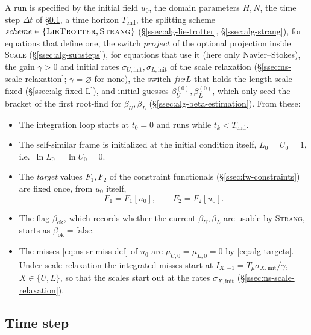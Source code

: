 \documentclass{article}
\begin{document}
A run is specified by the initial field $u_0$, the domain parameters $H, N$,
the time step $\Delta t$ of
\S\ref{ssec:alg-timestep}, a time horizon $T_{\mathrm{end}}$, the
splitting scheme
$\mathit{scheme} \in \{\textsc{LieTrotter}, \textsc{Strang}\}$
(\S\ref{ssec:alg-lie-trotter}, \S\ref{ssec:alg-strang}), for equations that
define one, the switch $\mathit{project}$ of the optional projection inside
\textsc{Scale} (\S\ref{ssec:alg-substeps}), for equations that use it (here
only Navier--Stokes), the gain $\gamma > 0$ and initial rates
$\sigma_{U,\mathrm{init}}, \sigma_{L,\mathrm{init}}$ of the scale relaxation
(\S\ref{ssec:ns-scale-relaxation}; $\gamma = \varnothing$ for none), the
switch $\mathit{fixL}$ that holds the length scale fixed
(\S\ref{ssec:alg-fixed-L}), and initial guesses
$\beta_U^{(0)}, \beta_L^{(0)}$, which only seed the bracket of the first
root-find for $\beta_U, \beta_L$ (\S\ref{ssec:alg-beta-estimation}). From these:
\begin{itemize}
  \item The integration loop starts at $t_0 = 0$ and runs while $t_k < T_{\mathrm{end}}$.
  \item The self-similar frame is initialized at the initial condition itself,
  $L_0 = U_0 = 1$, i.e.\ $\ln L_0 = \ln U_0 = 0$.
  \item The \emph{target} values $F_1, F_2$ of the constraint functionals
  (\S\ref{ssec:fw-constraints}) are fixed once, from $u_0$ itself,
  \begin{equation}\label{eq:alg-targets}
    F_1 = F_1[u_0], \qquad F_2 = F_2[u_0].
  \end{equation}
  \item The flag $\beta_{\mathrm{ok}}$, which records whether the current
  $\beta_U, \beta_L$ are usable by \textsc{Strang}, starts as
  $\beta_{\mathrm{ok}} = \text{false}$.
  \item The misses \eqref{eq:ns-sr-miss-def} of $u_0$ are
  $\mu_{U,0} = \mu_{L,0} = 0$ by \eqref{eq:alg-targets}. Under scale
  relaxation the integrated misses start at
  $I_{X,-1} = T_\mu \sigma_{X,\mathrm{init}}/\gamma$, $X \in \{U, L\}$, so that
  the scales start out at the rates $\sigma_{X,\mathrm{init}}$
  (\S\ref{ssec:ns-scale-relaxation}).
\end{itemize}

\subsection{Time step}\label{ssec:alg-timestep}
\end{document}
